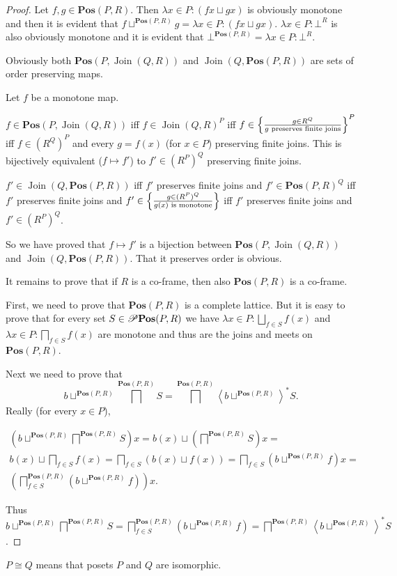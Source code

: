 \begin{proof}
Let $f,g\in\mathbf{Pos}(P,R)$. Then $\lambda x\in P:(fx\sqcup gx)$
is obviously monotone and then it is evident that $f\sqcup^{\mathbf{Pos}(P,R)}g=\lambda x\in P:(fx\sqcup gx)$.
$\lambda x\in P:\bot^{R}$ is also obviously monotone and it is evident
that $\bot^{\mathbf{Pos}(P,R)}=\lambda x\in P:\bot^{R}$.

Obviously both $\mathbf{Pos}(P,\operatorname{Join}(Q,R))$ and $\operatorname{Join}\left(Q,\mathbf{Pos}(P,R)\right)$
are sets of order preserving maps.

Let $f$ be a monotone map.

$f\in\mathbf{Pos}(P,\operatorname{Join}(Q,R))$ iff $f\in\operatorname{Join}(Q,R)^{P}$
iff $f\in\left\{ \frac{ g\in R^{Q} }{ g\text{ preserves finite joins}}\right\} ^{P}$
iff $f\in(R^{Q})^{P}$ and every $g=f(x)$ (for $x\in P$) preserving
finite joins. This is bijectively equivalent ($f\mapsto f'$) to $f'\in(R^{P})^{Q}$
preserving finite joins.

$f'\in\operatorname{Join}\left(Q,\mathbf{Pos}(P,R)\right)$ iff $f'$
preserves finite joins and $f'\in\mathbf{Pos}(P,R)^{Q}$ iff $f'$
preserves finite joins and $f'\in\left\{ \frac{g\in(R^{P})^{Q}}{g(x)\text{ is monotone}}\right\}$
iff $f'$ preserves finite joins and $f'\in(R^{P})^{Q}$.

So we have proved that $f\mapsto f'$ is a bijection between $\mathbf{Pos}(P,\operatorname{Join}(Q,R))$
and $\operatorname{Join}\left(Q,\mathbf{Pos}(P,R)\right)$. That it
preserves order is obvious.

It remains to prove that if $R$ is a co-frame, then also $\mathbf{Pos}(P,R)$
is a co-frame.

First, we need to prove that $\mathbf{Pos}(P,R)$ is a complete lattice.
But it is easy to prove that for every set $S\in\mathscr{P}\mathbf{Pos}(P,R)$
we have $\lambda x\in P:\bigsqcup_{f\in S}f(x)$ and $\lambda x\in P:\bigsqcap_{f\in S}f(x)$
are monotone and thus are the joins and meets on $\mathbf{Pos}(P,R)$.

Next we need to prove that 
\[
b\sqcup^{\mathbf{Pos}(P,R)}\bigsqcap^{\mathbf{Pos}(P,R)}S=\bigsqcap^{\mathbf{Pos}(P,R)}\left\langle b\sqcup^{\mathbf{Pos}(P,R)}\right\rangle ^{\ast}S.
\]
Really (for every $x\in P$),

\begin{multline*}
\left(b\sqcup^{\mathbf{Pos}(P,R)}\bigsqcap^{\mathbf{Pos}(P,R)}S\right)x=b(x)\sqcup\left(\bigsqcap^{\mathbf{Pos}(P,R)}S\right)x=\\
b(x)\sqcup\bigsqcap_{f\in S}f(x)=\bigsqcap_{f\in S}(b(x)\sqcup f(x))=\bigsqcap_{f\in S}\left(b\sqcup^{\mathbf{Pos}(P,R)}f\right)x=\\
\left(\bigsqcap_{f\in S}^{\mathbf{Pos}(P,R)}\left(b\sqcup^{\mathbf{Pos}(P,R)}f\right)\right)x.
\end{multline*}


Thus $b\sqcup^{\mathbf{Pos}(P,R)}\bigsqcap^{\mathbf{Pos}(P,R)}S=\bigsqcap_{f\in S}^{\mathbf{Pos}(P,R)}\left(b\sqcup^{\mathbf{Pos}(P,R)}f\right)=\bigsqcap^{\mathbf{Pos}(P,R)}\left\langle b\sqcup^{\mathbf{Pos}(P,R)}\right\rangle ^{\ast}S$.
\end{proof}
\begin{defn}
$P\cong Q$ means that posets $P$ and $Q$ are isomorphic.\end{defn}